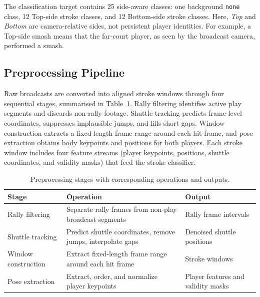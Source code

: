The classification target contains 25 side-aware classes: one background
\texttt{none} class, 12 Top-side stroke classes, and 12 Bottom-side stroke
classes. Here, \emph{Top} and \emph{Bottom} are camera-relative sides, not
persistent player identities. For example, a Top-side smash means that the
far-court player, as seen by the broadcast camera, performed a smash.

\subsection{Preprocessing Pipeline}

Raw broadcasts are converted into aligned stroke windows through four sequential
stages, summarised in Table~\ref{tab:preproc}. Rally filtering identifies active
play segments and discards non-rally footage. Shuttle tracking predicts
frame-level coordinates, suppresses implausible jumps, and fills short gaps.
Window construction extracts a fixed-length frame range around each hit-frame,
and pose extraction obtains body keypoints and positions for both players. Each
stroke window includes four feature streams (player keypoints, positions,
shuttle coordinates, and validity masks) that feed the stroke classifier.

\begin{table}[h]
  \caption{Preprocessing stages with corresponding operations and outputs.}
  \label{tab:preproc}
  \centering
  \small
  \begin{tabular}{p{3.3cm} p{5.5cm} p{4.1cm}}
    \toprule
    Stage & Operation & Output \\
    \midrule
    Rally filtering
      & Separate rally frames from non-play broadcast segments & Rally frame intervals \\
    Shuttle tracking
      & Predict shuttle coordinates, remove jumps, interpolate gaps & Denoised shuttle positions \\
    Window construction
      & Extract fixed-length frame range around each hit frame & Stroke windows \\
    Pose extraction
      & Extract, order, and normalize player keypoints & Player features and validity masks \\
    \bottomrule
  \end{tabular}
\end{table}